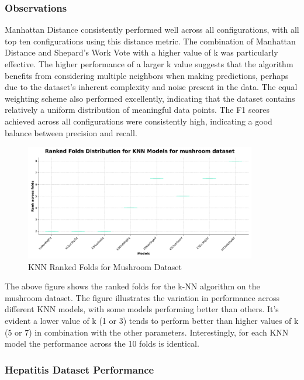 \subsubsection*{Observations}
Manhattan Distance consistently performed well across all configurations, with all top ten configurations using this distance metric.
The combination of Manhattan Distance and Shepard's Work Vote with a higher value of k was particularly effective. 
The higher performance of a larger k value suggests that the algorithm benefits from considering multiple neighbors when making predictions, perhaps
due to the dataset's inherent complexity and noise present in the data. The equal weighting scheme also performed excellently,
indicating that the dataset contains relatively a uniform
distribution of meaningful data points.
The F1 scores achieved across all configurations were consistently high, indicating a good balance between precision and recall.

\begin{figure}
    \centering
    \includegraphics[width=0.9\textwidth]{figures/ranked_folds_KNN_mushroom.png}
    \caption{KNN Ranked Folds for Mushroom Dataset}
    \label{fig:ranked_folds_KNN_mushroom}
\end{figure}

The above figure shows the ranked folds for the k-NN algorithm on the mushroom dataset.
The figure illustrates the variation in performance across different KNN models, with some models performing 
better than others. It's evident a lower value of k (1 or 3) tends to perform better than higher values of k (5 or 7)
in combination with the other parameters. 
Interestingly, for each KNN model the performance across the 10 folds is identical.

\subsubsection{Hepatitis Dataset Performance}

